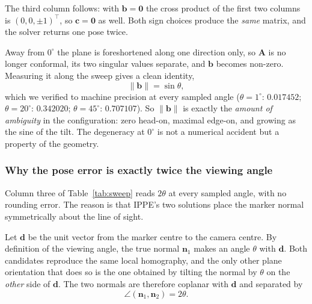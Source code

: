 \documentclass[11pt,a4paper]{article}
\theoremstyle{definition}
\theoremstyle{plain}
\theoremstyle{remark}
\begin{document}
The third column follows: with $\mathbf{b}=\mathbf{0}$ the cross product of the
first two columns is $(0,0,\pm1)^\top$, so $\mathbf{c}=\mathbf{0}$ as well.
Both sign choices produce the \emph{same} matrix, and the solver returns one
pose twice.

Away from $0^\circ$ the plane is foreshortened along one direction only, so
$\mathbf{A}$ is no longer conformal, its two singular values separate, and
$\mathbf{b}$ becomes non-zero. Measuring it along the sweep gives a clean
identity,
\begin{equation}
  \|\mathbf{b}\| = \sin\theta ,
  \label{eq:b-sin}
\end{equation}
which we verified to machine precision at every sampled angle
($\theta=1^\circ$: $0.017452$; $\theta=20^\circ$: $0.342020$;
$\theta=45^\circ$: $0.707107$). So $\|\mathbf{b}\|$ is exactly the
\emph{amount of ambiguity} in the configuration: zero head-on, maximal
edge-on, and growing as the sine of the tilt. The degeneracy at $0^\circ$ is
not a numerical accident but a property of the geometry.

\subsubsection{Why the pose error is exactly twice the viewing angle}

Column three of Table~\ref{tab:sweep} reads $2\theta$ at every sampled angle,
with no rounding error. The reason is that IPPE's two solutions place the
marker normal symmetrically about the line of sight.

Let $\mathbf{d}$ be the unit vector from the marker centre to the camera
centre. By definition of the viewing angle, the true normal $\mathbf{n}_1$
makes an angle $\theta$ with $\mathbf{d}$. Both candidates reproduce the same
local homography, and the only other plane orientation that does so is the one
obtained by tilting the normal by $\theta$ on the \emph{other} side of
$\mathbf{d}$. The two normals are therefore coplanar with $\mathbf{d}$ and
separated by
\begin{equation}
  \angle(\mathbf{n}_1,\mathbf{n}_2) = 2\theta .
\end{equation}
\end{document}
